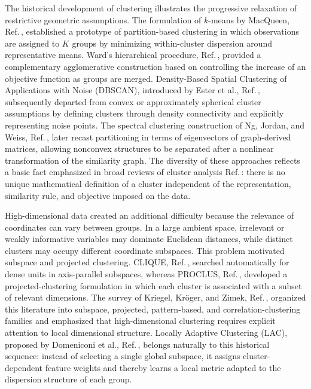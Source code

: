 \documentclass[11pt,a4paper]{article}
\theoremstyle{definition}
\theoremstyle{plain}
\begin{document}
The historical development of clustering illustrates the progressive relaxation of restrictive geometric assumptions. The formulation of $k$-means by MacQueen, Ref.\,\cite{macqueen1967}, established a prototype of partition-based clustering in which observations are assigned to $K$ groups by minimizing within-cluster dispersion around representative means. Ward's hierarchical procedure, Ref.\,\cite{ward1963}, provided a complementary agglomerative construction based on controlling the increase of an objective function as groups are merged. Density-Based Spatial Clustering of Applications with Noise (DBSCAN), introduced by Ester et al., Ref.\,\cite{ester1996dbscan}, subsequently departed from convex or approximately spherical cluster assumptions by defining clusters through density connectivity and explicitly representing noise points. The spectral clustering construction of Ng, Jordan, and Weiss, Ref.\,\cite{ng2002spectral}, later recast partitioning in terms of eigenvectors of graph-derived matrices, allowing nonconvex structures to be separated after a nonlinear transformation of the similarity graph. The diversity of these approaches reflects a basic fact emphasized in broad reviews of cluster analysis Ref.\,\cite{jain1999review,jain2010clustering}: there is no unique mathematical definition of a cluster independent of the representation, similarity rule, and objective imposed on the data.

High-dimensional data created an additional difficulty because the relevance of coordinates can vary between groups. In a large ambient space, irrelevant or weakly informative variables may dominate Euclidean distances, while distinct clusters may occupy different coordinate subspaces. This problem motivated subspace and projected clustering. CLIQUE, Ref.\,\cite{agrawal1998clique}, searched automatically for dense units in axis-parallel subspaces, whereas PROCLUS, Ref.\,\cite{aggarwal1999proclus}, developed a projected-clustering formulation in which each cluster is associated with a subset of relevant dimensions. The survey of Kriegel, Kr\"oger, and Zimek, Ref.\,\cite{kriegel2009survey}, organized this literature into subspace, projected, pattern-based, and correlation-clustering families and emphasized that high-dimensional clustering requires explicit attention to local dimensional structure. Locally Adaptive Clustering (LAC), proposed by Domeniconi et al., Ref.\,\cite{domeniconi2007lac}, belongs naturally to this historical sequence: instead of selecting a single global subspace, it assigns cluster-dependent feature weights and thereby learns a local metric adapted to the dispersion structure of each group.
\end{document}

